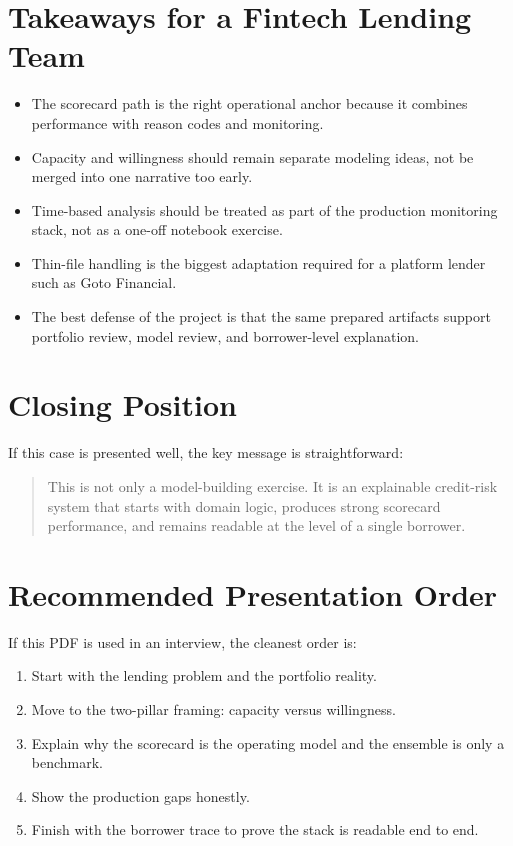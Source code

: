 \documentclass[11pt]{article}
\begin{document}
\section{Takeaways for a Fintech Lending Team}

\begin{itemize}
  \item The scorecard path is the right operational anchor because it combines performance with reason codes and monitoring.
  \item Capacity and willingness should remain separate modeling ideas, not be merged into one narrative too early.
  \item Time-based analysis should be treated as part of the production monitoring stack, not as a one-off notebook exercise.
  \item Thin-file handling is the biggest adaptation required for a platform lender such as Goto Financial.
  \item The best defense of the project is that the same prepared artifacts support portfolio review, model review, and borrower-level explanation.
\end{itemize}

\section{Closing Position}

If this case is presented well, the key message is straightforward:

\begin{quote}
This is not only a model-building exercise. It is an explainable credit-risk system that starts with domain logic, produces strong scorecard performance, and remains readable at the level of a single borrower.
\end{quote}

\section*{Recommended Presentation Order}

If this PDF is used in an interview, the cleanest order is:

\begin{enumerate}
  \item Start with the lending problem and the portfolio reality.
  \item Move to the two-pillar framing: capacity versus willingness.
  \item Explain why the scorecard is the operating model and the ensemble is only a benchmark.
  \item Show the production gaps honestly.
  \item Finish with the borrower trace to prove the stack is readable end to end.
\end{enumerate}
\end{document}
